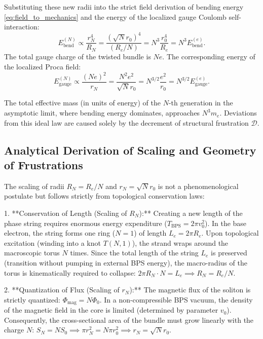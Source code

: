 \documentclass[11pt,a4paper]{article}
\begin{document}
Substituting these new radii into the strict field derivation of bending energy \eqref{eq:field_to_mechanics} and the energy of the localized gauge Coulomb self-interaction:
\begin{equation}
	E_{\text{bend}}^{(N)} \propto \frac{r_N^4}{R_N} = \frac{(\sqrt{N} r_0)^4}{(R_e / N)} = N^3 \frac{r_0^4}{R_e} = N^3 E_{\text{bend}}^{(e)}.
\end{equation}
The total gauge charge of the twisted bundle is $N e$. The corresponding energy of the localized Proca field:
\begin{equation}
	E_{\text{gauge}}^{(N)} \propto \frac{(Ne)^2}{r_N} = \frac{N^2 e^2}{\sqrt{N} r_0} = N^{3/2} \frac{e^2}{r_0} = N^{3/2} E_{\text{gauge}}^{(e)}.
\end{equation}

The total effective mass (in units of energy) of the $N$-th generation in the asymptotic limit, where bending energy dominates, approaches $N^3 m_e$. Deviations from this ideal law are caused solely by the decrement of structural frustration $\mathcal{D}$.

\subsection{Analytical Derivation of Scaling and Geometry of Frustrations}
The scaling of radii $R_N = R_e/N$ and $r_N = \sqrt{N}r_0$ is not a phenomenological postulate but follows strictly from topological conservation laws:

1. **Conservation of Length (Scaling of $R_N$):** Creating a new length of the phase string requires enormous energy expenditure ($T_{\text{BPS}} = 2\pi v_0^2$). In the base electron, the string forms one ring ($N=1$) of length $L_e = 2\pi R_e$. Upon topological excitation (winding into a knot $T(N,1)$), the strand wraps around the macroscopic torus $N$ times. Since the total length of the string $L_e$ is preserved (transition without pumping in external BPS energy), the macro-radius of the torus is kinematically required to collapse: $2\pi R_N \cdot N = L_e \implies R_N = R_e/N$.

2. **Quantization of Flux (Scaling of $r_N$):** The magnetic flux of the soliton is strictly quantized: $\Phi_{\text{mag}} = N \Phi_0$. In a non-compressible BPS vacuum, the density of the magnetic field in the core is limited (determined by parameter $v_0$). Consequently, the cross-sectional area of the bundle must grow linearly with the charge $N$: $S_N = N S_0 \implies \pi r_N^2 = N \pi r_0^2 \implies r_N = \sqrt{N} r_0$.
\end{document}

